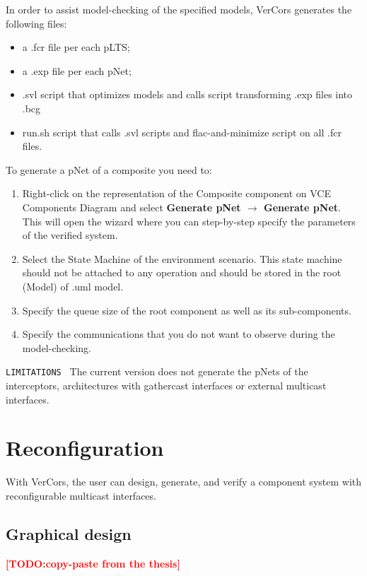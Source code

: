 \documentclass[12pt]{article}
\newcommand{\TODO}[1]{\textcolor{red}{\textbf{[TODO:#1]}}}
\begin{document}
In order to assist model-checking of the specified models, VerCors generates the following files:
\begin{itemize}
\item
a .fcr file per each pLTS;
\item
a .exp file per each pNet;
\item
.svl script that optimizes models and calls script transforming .exp files into .bcg
\item
run.sh script that calls .svl scripts and flac-and-minimize script on all .fcr files.
\end{itemize}


To generate a pNet of a composite you need to:
\begin{enumerate}
\item
Right-click on the representation of the Composite component on VCE Components Diagram and select \textbf{Generate pNet $\rightarrow$ Generate pNet}. This will open the wizard where you can step-by-step specify the parameters of the verified system.
\item
Select the State Machine of the environment scenario. This state machine should not be attached to any operation and should be stored in the root (Model) of .uml model.
\item
Specify the queue size of the root component as well as its sub-components.
\item
Specify the communications that you do not want to observe during the model-checking.
\end{enumerate}

\texttt{LIMITATIONS } The current version does not generate the pNets of the interceptors, architectures with gathercast interfaces or external multicast interfaces.

\section{Reconfiguration}

With VerCors, the user can design, generate, and verify a component system with reconfigurable multicast interfaces.

\subsection{Graphical design}

\TODO{copy-paste from the thesis}
\end{document}
